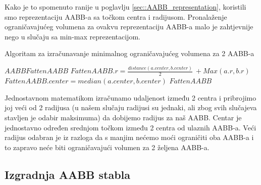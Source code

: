 Kako je to spomenuto ranije u poglavlju \ref{sec::AABB_representation}, koristili smo reprezentaciju AABB-a sa točkom centra i radijusom. Pronalaženje ograničavajućeg volumena za ovakvu reprezentaciju AABB-a malo je zahtjevnije nego u slučaju sa min-max reprezentacijom.
\begin{algorithm}
\caption{Algoritam za izračunavanje minimalnog ograničavajućeg volumena za 2 AABB-a}
\label{alg:fatten_aabb}
\begin{algorithmic}
		\State $AABB FattenAABB$ 
		\State$FattenAABB.r =\frac{distance(a.center,b.center)}{2}\ + Max(a.r,b.r)$
		\State$FattenAABB.center = median(a.center,b.center)$
		\State \Return $FattenAABB$
	
	\EndFunction
\end{algorithmic}
\end{algorithm}
\newline
Jednostavnom matematikom izračunamo udaljenost između 2 centra i pribrojimo joj veći od 2 radijusa (u našem slučaju radijusi su jednaki, ali zbog svih slučajeva stavljen je odabir maksimuma) da dobijemo radijus za naš AABB. Centar je jednostavno određen srednjom točkom između 2 centra od ulaznih AABB-a. Veći radijus odabran je iz razloga da s manjim nećemo moći ograničiti oba AABB-a i to zapravo neće biti ograničavajući volumen za 2 željena AABB-a. 
\subsection{Izgradnja AABB stabla}

